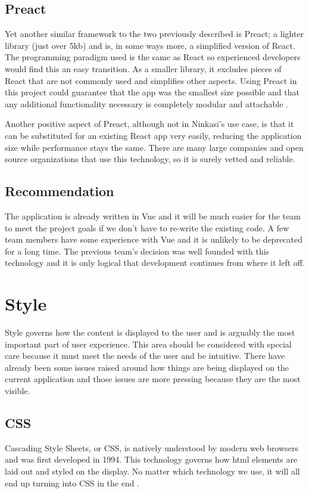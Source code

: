 \documentclass[draftclsnofoot,onecolumn,journal,letterpaper,compsoc,10pt]{IEEEtran}
\begin{document}
        \subsection{Preact}
        Yet another similar framework to the two previously described is Preact; a lighter library (just over 5kb) and is, in some ways more, a simplified version of React. The programming paradigm used is the same as React so experienced developers would find this an easy transition. As a smaller library, it excludes pieces of React that are not commonly used and simplifies other aspects. Using Preact in this project could guarantee that the app was the smallest size possible and that any additional functionality necessary is completely modular and attachable \cite{preact}.
        
        Another positive aspect of Preact, although not in Ninkasi's use case, is that it can be substituted for an existing React app very easily, reducing the application size while performance stays the same. There are many large companies and open source organizations that use this technology, so it is surely vetted and reliable.
        
        \subsection{Recommendation}
        The application is already written in Vue and it will be much easier for the team to meet the project goals if we don't have to re-write the existing code. A few team members have some experience with Vue and it is unlikely to be deprecated for a long time. The previous team's decision was well founded with this technology and it is only logical that development continues from where it left off.  

    \section{Style}
    Style governs how the content is displayed to the user and is arguably the most important part of user experience. This area should be considered with special care because it must meet the needs of the user and be intuitive. There have already been some issues raised around how things are being displayed on the current application and those issues are more pressing because they are the most visible.
        \subsection{CSS}
        Cascading Style Sheets, or CSS, is natively understood by modern web browsers and was first developed in 1994. This technology governs how html elements are laid out and styled on the display. No matter which technology we use, it will all end up turning into CSS in the end \cite{css}. 
        
\end{document}
